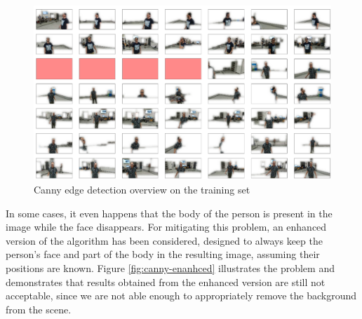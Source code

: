 \begin{figure}[!htb]
	\centering
	\includegraphics[width=1\textwidth]{"contents/images/04-1canny-overview"}
	\caption[Canny edge detection overview on the training set]{Canny edge detection overview on the training set}
	\label{fig:canny-overview}
\end{figure}

\medskip

In some cases, it even happens that the body of the person is present in the image while the face disappears. For mitigating this problem, an enhanced version of the algorithm has been considered, designed to always keep the person's face and part of the body in the resulting image, assuming their positions are known. Figure \ref{fig:canny-enanhced} illustrates the problem and demonstrates that results obtained from the enhanced version are still not acceptable, since we are not able enough to appropriately remove the background from the scene.

